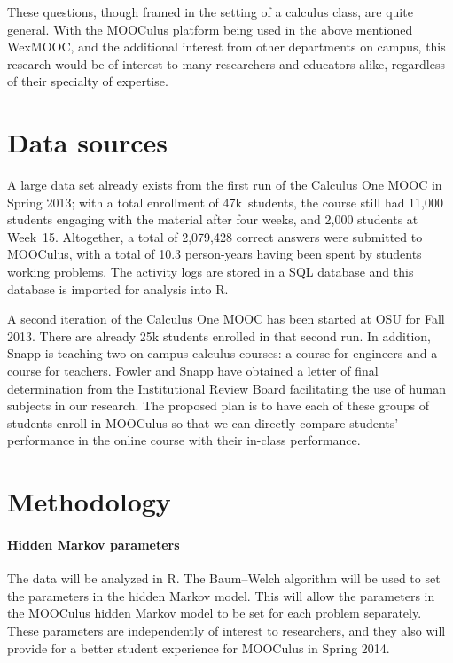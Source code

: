 \documentclass[12pt]{article}
\begin{document}
These questions, though framed in the setting of a calculus class, are
quite general. With the MOOCulus platform being used in the above
mentioned WexMOOC, and the additional interest from other departments
on campus, this research would be of interest to many researchers and
educators alike, regardless of their specialty of expertise.

\section{Data sources}

A large data set already exists from the first run of the Calculus One
MOOC in Spring 2013; with a total enrollment of 47k~students, the
course still had 11,000 students engaging with the material after four
weeks, and 2,000 students at Week~15.  Altogether, a total of
2,079,428 correct answers were submitted to MOOCulus, with a total of
10.3 person-years having been spent by students working problems.  The
activity logs are stored in a SQL database and this database is
imported for analysis into R.

A second iteration of the Calculus One MOOC has been started at OSU
for Fall 2013.  There are already 25k students enrolled in that second
run.  In addition, Snapp is teaching two on-campus calculus courses: a
course for engineers and a course for teachers.  Fowler and Snapp have
obtained a letter of final determination from the Institutional Review
Board facilitating the use of human subjects in our research.  The
proposed plan is to have each of these groups of students enroll in
MOOCulus so that we can directly compare students' performance in the
online course with their in-class performance.

\section{Methodology}

\paragraph{Hidden Markov parameters}

The data will be analyzed in R. The Baum--Welch algorithm will be used
to set the parameters in the hidden Markov model. This will allow the
parameters in the MOOCulus hidden Markov model to be set for each
problem separately.  These parameters are independently of interest to
researchers, and they also will provide for a better student
experience for MOOCulus in Spring 2014.
\end{document}
